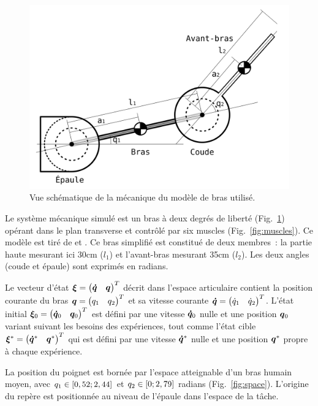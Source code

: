\documentclass[pdftex,a4paper,11pt]{article}
\begin{document}
\begin{figure}[h]
    \centering
    \includegraphics[width=.80\linewidth]{fig/arm2_fr}
    \caption{Vue schématique de la mécanique du modèle de bras utilisé.}
    \label{fig:arm}
\end{figure}

Le système mécanique simulé est un bras à deux degrés de liberté
(Fig.~\ref{fig:arm}) opérant dans le plan transverse
et contrôlé par six muscles (Fig.~\ref{fig:muscles}).
Ce modèle est tiré de \cite{rigoux11} et \cite{li2006}.
Ce bras simplifié est constitué de deux membres~: la partie haute mesurant ici
30cm ($l_1$) et l'avant-bras mesurant 35cm ($l_2$).
Les deux angles (coude et épaule) sont exprimés en radians.

Le vecteur d'état $\boldsymbol{\xi} = \begin{pmatrix} \boldsymbol{\dot{q}} & \boldsymbol{q} \end{pmatrix}^T$ décrit
dans l'espace articulaire contient la position courante du bras
$\boldsymbol{q} = \begin{pmatrix} q_1 & q_2 \end{pmatrix}^T$ et sa vitesse courante
$\boldsymbol{\dot{q}} = \begin{pmatrix} \dot{q}_1 & \dot{q}_2 \end{pmatrix}^T$.
L'état initial $\boldsymbol{\xi}_0 = \begin{pmatrix} \boldsymbol{\dot{q}}_0 & \boldsymbol{q}_0 \end{pmatrix}^T$ est
défini par une vitesse $\boldsymbol{\dot{q}}_0$ nulle et une position $\boldsymbol{q}{}_0$ variant suivant
les besoins des expériences,
tout comme l'état cible $\boldsymbol{\xi}^* = \begin{pmatrix} \boldsymbol{\dot{q}}^* & \boldsymbol{q}^* \end{pmatrix}^T$
qui est défini par une vitesse $\boldsymbol{\dot{q}}^*$ nulle et une position $\boldsymbol{q}^*$
propre à chaque expérience.

La position du poignet est bornée par l'espace atteignable d'un bras humain moyen,
avec $q_1 \in [0,52 ; 2,44]$ et $q_2 \in [0 ; 2,79]$ radians (Fig.~\ref{fig:space}).
L'origine du repère est positionnée au niveau de l'épaule dans l'espace de la tâche.
\end{document}
